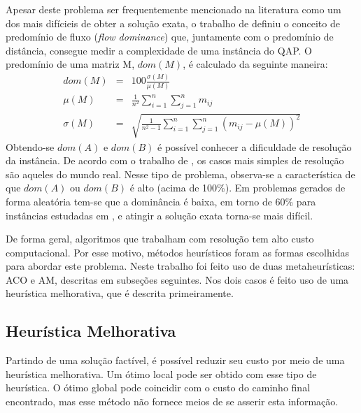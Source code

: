 Apesar deste problema ser frequentemente mencionado na literatura como
um dos mais difícieis de obter a solução exata, o trabalho de
\cite{dominance} definiu o conceito de predomínio de fluxo
(\textit{flow dominance}) que, juntamente com o predomínio de
distância, consegue medir a complexidade de uma instância do QAP. O
predomínio de uma matriz M, $dom(M)$, é calculado da seguinte maneira:
\begin{eqnarray}
dom(M) &=& 100 \frac{\sigma(M)}{\mu(M)} \\
\mu(M) &=& \frac{1}{n^2} \sum_{i=1}^n \sum_{j=1}^n m_{ij} \nonumber \\
\sigma(M) &=& \sqrt{\frac{1}{n^2 - 1} \sum_{i=1}^n \sum_{j=1}^n
(m_{ij} - \mu(M))^2} \nonumber
\end{eqnarray}
Obtendo-se $dom(A)$ e $dom(B)$ é possível conhecer a dificuldade de
resolução da instância. De acordo com o trabalho de \cite{taillard1},
os casos mais simples de resolução são aqueles do mundo real. Nesse
tipo de problema, observa-se a característica de que $dom(A)$ ou
$dom(B)$ é alto (acima de 100\%). Em problemas gerados de forma
aleatória tem-se que a dominância é baixa, em torno de 60\% para
instâncias estudadas em \cite{taillard1}, e atingir a solução exata
torna-se mais difícil.

De forma geral, algoritmos que trabalham com resolução tem alto custo
computacional. Por esse motivo, métodos heurísticos foram as formas
escolhidas para abordar este problema. Neste trabalho foi feito uso de
duas metaheurísticas: ACO e AM, descritas em subseções seguintes.
Nos dois casos é feito uso de uma heurística melhorativa, que é
descrita primeiramente.


\subsection{Heurística Melhorativa}

Partindo de uma solução factível, é possível reduzir seu custo por
meio de uma heurística melhorativa. Um ótimo local pode ser obtido com
esse tipo de heurística. O ótimo global pode coincidir com o custo do
caminho final encontrado, mas esse método não fornece meios de se
asserir esta informação.

